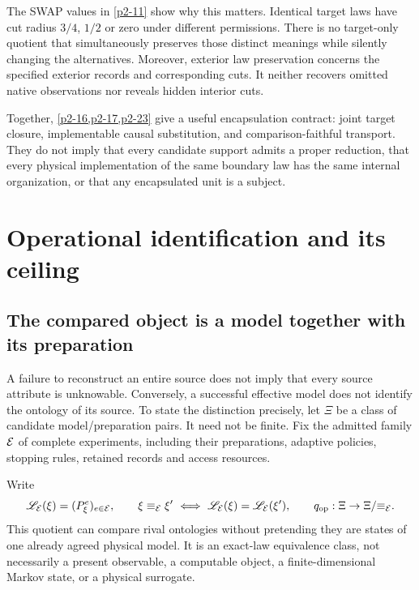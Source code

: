 The SWAP values in \cref{p2-11} show why this matters. Identical target laws have cut radius \(3/4\), \(1/2\) or zero under different permissions. There is no target-only quotient that simultaneously preserves those distinct meanings while silently changing the alternatives. Moreover, exterior law preservation concerns the specified exterior records and corresponding cuts. It neither recovers omitted native observations nor reveals hidden interior cuts.

Together, \cref{p2-16,p2-17,p2-23} give a useful encapsulation contract: joint target closure, implementable causal substitution, and comparison-faithful transport. They do not imply that every candidate support admits a proper reduction, that every physical implementation of the same boundary law has the same internal organization, or that any encapsulated unit is a subject.



\section{Operational identification and its ceiling}\label{sec:identification}
\subsection{The compared object is a model together with its preparation}
A failure to reconstruct an entire source does not imply that every source attribute is unknowable. Conversely, a successful effective model does not identify the ontology of its source. To state the distinction precisely, let \(\Xi\) be a class of candidate model/preparation pairs. It need not be finite. Fix the admitted family \(\mathcal E\) of complete experiments, including their preparations, adaptive policies, stopping rules, retained records and access resources.

Write
\begin{equation}\label{eq:operational-lawmap}
 \mathscr L_{\mathcal E}(\xi)=(P^e_\xi)_{e\in\mathcal E},\qquad
 \xi\equiv_{\mathcal E}\xi'\ \Longleftrightarrow\ \mathscr L_{\mathcal E}(\xi)=\mathscr L_{\mathcal E}(\xi'),
 \qquad q_{\mathrm{op}}:\Xi\to\Xi/{\equiv_{\mathcal E}}.
\end{equation}
This quotient can compare rival ontologies without pretending they are states of one already agreed physical model. It is an exact-law equivalence class, not necessarily a present observable, a computable object, a finite-dimensional Markov state, or a physical surrogate.

